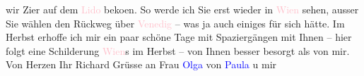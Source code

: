                wir Zi{\geminationm}er auf dem \textcolor{pink}{Lido}{}\ledrightnote{\textcolor{pink}{Lido}} beko{\geminationm}en. So werde ich Sie erst wieder in \textcolor{pink}{Wien}{}\ledrightnote{\textcolor{pink}{Wien}} sehen, ausser Sie wählen den Rückweg über \textcolor{pink}{Venedig}{}\ledrightnote{\textcolor{pink}{Venedig}} – was ja auch einiges für sich hätte. Im
                  Herbst erhoffe ich mir  ein paar
               schöne Tage mit Spaziergängen mit Ihnen – hier folgt eine Schilderung \textcolor{pink}{Wien}{}\ledrightnote{\textcolor{pink}{Wien}}s im Herbst – von Ihnen besser besorgt als von mir. Von
               Herzen\pend
           \pstart Ihr \spacefill\mbox{Richard}\pend{}\pstart
           Grüsse an Frau \textcolor{blue}{Olga}{}\ledrightnote{\textcolor{blue}{Olga Schnitzler}} von \textcolor{blue}{Paula}{}\ledrightnote{\textcolor{blue}{Paula Beer-Hofmann}} u mir\pend
           \endnumbering{}  
      